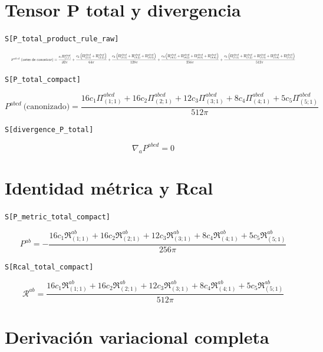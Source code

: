 \documentclass[11pt,a4paper]{article}
\begin{document}
\section*{Tensor P total y divergencia}

\noindent\texttt{S[P\_total\_product\_rule\_raw]}

\[
\resizebox{\textwidth}{!}{$\displaystyle P^{abcd}\ \text{(antes de canonizar)} = \frac{c_{1} \Pi^{abcd}_{(1;1)}}{32 \pi} + \frac{c_{2} \left(\Pi^{abcd}_{(2;1)} + \Pi^{abcd}_{(2;2)}\right)}{64 \pi} + \frac{c_{3} \left(\Pi^{abcd}_{(3;1)} + \Pi^{abcd}_{(3;2)} + \Pi^{abcd}_{(3;3)}\right)}{128 \pi} + \frac{c_{4} \left(\Pi^{abcd}_{(4;1)} + \Pi^{abcd}_{(4;2)} + \Pi^{abcd}_{(4;3)} + \Pi^{abcd}_{(4;4)}\right)}{256 \pi} + \frac{c_{5} \left(\Pi^{abcd}_{(5;1)} + \Pi^{abcd}_{(5;2)} + \Pi^{abcd}_{(5;3)} + \Pi^{abcd}_{(5;4)} + \Pi^{abcd}_{(5;5)}\right)}{512 \pi}$}
\]


\noindent\texttt{S[P\_total\_compact]}

\[
\boxed{P^{abcd}\ \text{(canonizado)} = \frac{16 c_{1} \Pi^{abcd}_{(1;1)} + 16 c_{2} \Pi^{abcd}_{(2;1)} + 12 c_{3} \Pi^{abcd}_{(3;1)} + 8 c_{4} \Pi^{abcd}_{(4;1)} + 5 c_{5} \Pi^{abcd}_{(5;1)}}{512 \pi}}
\]


\noindent\texttt{S[divergence\_P\_total]}

\[
\boxed{\nabla_aP^{abcd} = 0}
\]


\section*{Identidad métrica y Rcal}

\noindent\texttt{S[P\_metric\_total\_compact]}

\[
\boxed{P^{ab} = - \frac{16 c_{1} \mathfrak{R}^{ab}_{(1;1)} + 16 c_{2} \mathfrak{R}^{ab}_{(2;1)} + 12 c_{3} \mathfrak{R}^{ab}_{(3;1)} + 8 c_{4} \mathfrak{R}^{ab}_{(4;1)} + 5 c_{5} \mathfrak{R}^{ab}_{(5;1)}}{256 \pi}}
\]


\noindent\texttt{S[Rcal\_total\_compact]}

\[
\boxed{\mathcal R^{ab} = \frac{16 c_{1} \mathfrak{R}^{ab}_{(1;1)} + 16 c_{2} \mathfrak{R}^{ab}_{(2;1)} + 12 c_{3} \mathfrak{R}^{ab}_{(3;1)} + 8 c_{4} \mathfrak{R}^{ab}_{(4;1)} + 5 c_{5} \mathfrak{R}^{ab}_{(5;1)}}{512 \pi}}
\]


\section*{Derivación variacional completa}
\end{document}
